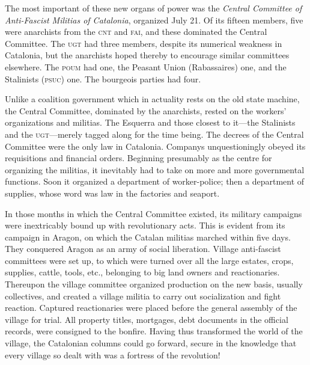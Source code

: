 The most important of these new organs of power was the \emph{Central Committee of Anti-Fascist Militias of Catalonia}, organized July 21. Of its fifteen members, five were anarchists from the \textsc{cnt} and \textsc{fai}, and these dominated the Central Committee. The \textsc{ugt} had three members, despite its numerical weakness in Catalonia, but the anarchists hoped thereby to encourage similar committees elsewhere. The \textsc{poum} had one, the Peasant Union (Rabassaires) one, and the Stalinists (\textsc{psuc}) one. The bourgeois parties had four.

Unlike a coalition government which in actuality rests on the old state machine, the Central Committee, dominated by the anarchists, rested on the workers’ organizations and militias. The Esquerra and those closest to it---the Stalinists and the \textsc{ugt}---merely tagged along for the time being. The decrees of the Central Committee were the only law in Catalonia. Companys unquestioningly obeyed its requisitions and financial orders. Beginning presumably as the centre for organizing the militias, it inevitably had to take on more and more governmental functions. Soon it organized a department of worker-police; then a department of supplies, whose word was law in the factories and seaport.

In those months in which the Central Committee existed, its military campaigns were inextricably bound up with revolutionary acts. This is evident from its campaign in Aragon, on which the Catalan militias marched within five days. They conquered Aragon as an army of social liberation. Village anti-fascist committees were set up, to which were turned over all the large estates, crops, supplies, cattle, tools, etc., belonging to big land owners and reactionaries. Thereupon the village committee organized production on the new basis, usually collectives, and created a village militia to carry out socialization and fight reaction. Captured reactionaries were placed before the general assembly of the village for trial. All property titles, mortgages, debt documents in the official records, were consigned to the bonfire. Having thus transformed the world of the village, the Catalonian columns could go forward, secure in the knowledge that every village so dealt with was a fortress of the revolution!

